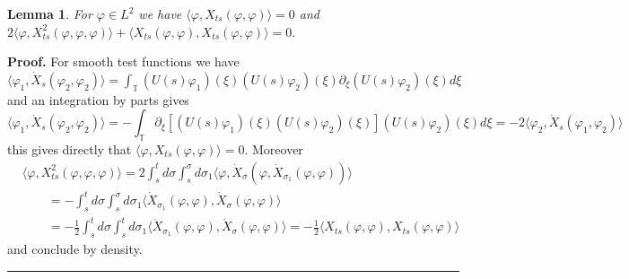 \documentclass[a4paper,11pt,reqno]{article}
\newcommand{\TT}{\mathbb{T}}
\newtheorem{lemma}[theorem]{Lemma}
\newenvironment{proof}[1][Proof]{\textbf{#1.} }{\ \rule{0.5em}{0.5em}}
\begin{document}
\begin{lemma} 
\label{lemma:more-symmetry}
For $\varphi \in L^2$ we have $\langle \varphi, X_{ts}(\varphi,\varphi)\rangle=0$ and
$
2 \langle \varphi, X^2_{ts}(\varphi,\varphi,\varphi)\rangle
+   \langle X_{ts}(\varphi,\varphi), X_{ts}(\varphi,\varphi)\rangle = 0.
$  
\end{lemma}
\begin{proof} For smooth test functions 
we have
$\langle \varphi_1 , \dot X_s(\varphi_2,\varphi_2) \rangle  =
\int_{\TT} (U(s)\varphi_1)(\xi) (U(s)\varphi_2)(\xi) \partial_{\xi}(U(s)\varphi_2)(\xi) d\xi
$
and an integration by parts gives
$$
\langle \varphi_1 , \dot X_s(\varphi_2,\varphi_2) \rangle  =
- \int_{\TT} \partial_{\xi}[(U(s)\varphi_1)(\xi) (U(s)\varphi_2)(\xi)] (U(s)\varphi_2)(\xi) d\xi =
- 2 \langle \varphi_2 , \dot X_s(\varphi_1,\varphi_2) \rangle
$$
this gives directly that $\langle \varphi, X_{ts}(\varphi,\varphi)\rangle=0$. Moreover
  \begin{equation}
    \label{eq:cons-law-3}
    \begin{split}
  & \langle \varphi, X^2_{ts}(\varphi,\varphi,\varphi)\rangle = 
2 \int_s^t d\sigma \int_s^\sigma  d\sigma_1  
  \langle \varphi, \dot X_\sigma(\varphi,\dot
  X_{\sigma_1}(\varphi,\varphi))\rangle 
\\ & \qquad 
=- 
\int_s^t d\sigma \int_s^\sigma  d\sigma_1  
  \langle \dot
  X_{\sigma_1}(\varphi,\varphi), \dot X_\sigma(\varphi,\varphi)\rangle        
\\ & \qquad 
=- \frac12
\int_s^t d\sigma \int_s^t  d\sigma_1  
  \langle \dot
  X_{\sigma_1}(\varphi,\varphi), \dot X_\sigma(\varphi,\varphi)\rangle        
=- \frac12
  \langle 
  X_{ts}(\varphi,\varphi),  X_{ts}(\varphi,\varphi)\rangle        
    \end{split}
  \end{equation}
  and conclude by density.
\end{proof}
\end{document}
